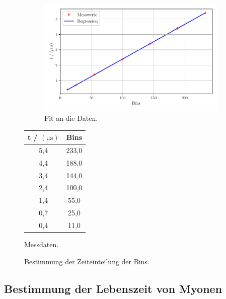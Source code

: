 \begin{figure}%
    \begin{subfigure}{0.68\textwidth}%
    \centering%
    \includegraphics[width=\textwidth]{build/zeiteinteilung.pdf}%
    \caption{Fit an die Daten.}%
    \label{fig:zeiteinteilung}%
    \end{subfigure}%
    \hfill%
    \begin{subtable}{0.28\textwidth}%
        \centering
        \begin{tabular}{c c}
        \toprule
        t / $(\unit{\micro\second})$ &  Bins \\
        \midrule
         5,4 & 233,0 \\
         4,4 & 188,0 \\
         3,4 & 144,0 \\
         2,4 & 100,0 \\
         1,4 &  55,0 \\
         0,7 &  25,0 \\
         0,4 &  11,0 \\
        \bottomrule
        \end{tabular}
        \caption{Messdaten.}
        \label{tab:zeiteinteilung}
    \end{subtable}%
    \caption{Bestimmung der Zeiteinteilung der Bins.}
    \label{subfig:zeiteinteilung}    
\end{figure}%
    
\subsection{Bestimmung der Lebenszeit von Myonen}

